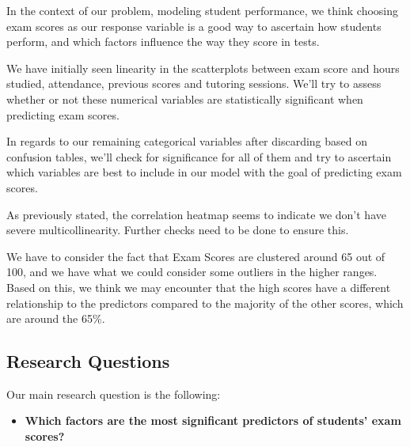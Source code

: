 \documentclass[twocolumn]{article} %
\begin{document}
In the context of our problem, modeling student performance, we think choosing exam scores as our response variable is a good way to ascertain how students perform, and which factors influence the way they score in tests.

We have initially seen linearity in the scatterplots between exam score and hours studied, attendance, previous scores and tutoring sessions. We'll try to assess whether or not these numerical variables are statistically significant when predicting exam scores.

In regards to our remaining categorical variables after discarding based on confusion tables, we'll check for significance for all of them and try to ascertain which variables are best to include in our model with the goal of predicting exam scores.

As previously stated, the correlation heatmap seems to indicate we don't have severe multicollinearity. Further checks need to be done to ensure this.

We have to consider the fact that Exam Scores are clustered around 65 out of 100, and we have what we could consider some outliers in the higher ranges. Based on this, we think we may encounter that the high scores have a different relationship to the predictors compared to the majority of the other scores, which are around the 65\%.

\subsection*{Research Questions}

Our main research question is the following:
\begin{itemize}
  \item
\textbf{Which factors are the most significant predictors of students' exam scores?}
\end{itemize}
\end{document}
